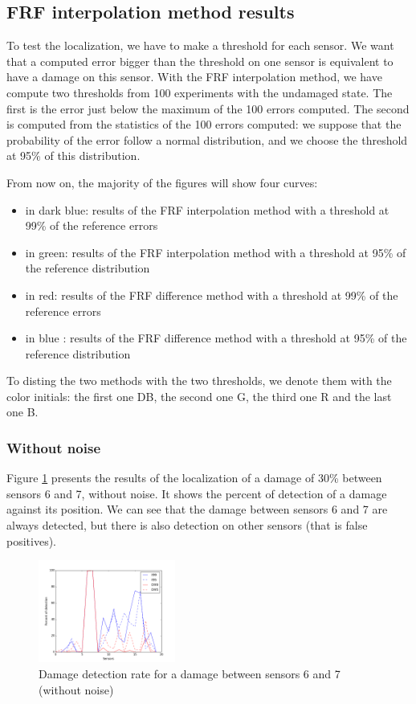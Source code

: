 \documentclass[journal]{IEEEtran}
\begin{document}
\subsection{FRF interpolation method results}

To test the localization, we have to make a threshold for each sensor. We want that a computed error bigger than the threshold on one sensor is equivalent to have a damage on this sensor. With the FRF interpolation method, we have compute two thresholds from 100 experiments with the undamaged state. The first is the error just below the maximum of the 100 errors computed. The second is computed from the statistics of the 100 errors computed: we suppose that the probability of the error follow a normal distribution, and we choose the threshold at 95\% of this distribution.

From now on, the majority of the figures will show four curves:
\begin{itemize}
\item in dark blue: results of the FRF interpolation method with a threshold at 99\% of the reference errors
\item in green: results of the FRF interpolation method with a threshold at 95\% of the reference distribution
\item in red: results of the FRF difference method with a threshold at 99\% of the reference errors
\item in blue : results of the FRF difference method with a threshold at 95\% of the reference distribution
\end{itemize}

To disting the two methods with the two thresholds, we denote them with the color initials: the first one DB, the second one G, the third one R and the last one B.

\subsubsection{Without noise}

Figure \ref{damage30} presents the results of the localization of a damage of 30\% between sensors 6 and 7, without noise.
It shows the percent of detection of a damage against its position.
We can see that the damage between sensors 6 and 7 are always detected, but there is also detection on other sensors (that is false positives).

\begin{figure}[h!]
  \centering
  \includegraphics[width=0.4\textwidth]{images/damage30percent.png}
  \caption{Damage detection rate for a damage between sensors 6 and 7 (without noise)}
  \label{damage30}
\end{figure}
\end{document}
